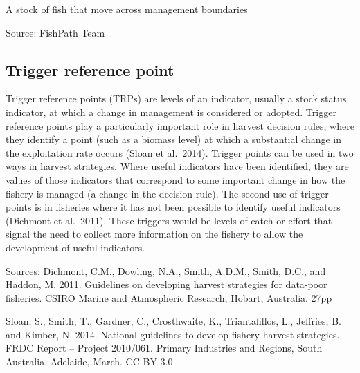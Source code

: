 \documentclass[
  11pt,
]{book}
\begin{document}
A stock of fish that move across management boundaries

Source: FishPath Team

\hypertarget{trigger-reference-point}{%
\subsection{Trigger reference point}\label{trigger-reference-point}}

Trigger reference points (TRPs) are levels of an indicator, usually a stock status indicator, at which a change in management is considered or adopted. Trigger reference points play a particularly important role in harvest decision rules, where they identify a point (such as a biomass level) at which a substantial change in the exploitation rate occurs (Sloan et al.~2014). Trigger points can be used in two ways in harvest strategies. Where useful indicators have been identified, they are values of those indicators that correspond to some important change in how the fishery is managed (a change in the decision rule). The second use of trigger points is in fisheries where it has not been possible to identify useful indicators (Dichmont et al.~2011). These triggers would be levels of catch or effort that signal the need to collect more information on the fishery to allow the development of useful indicators.

Sources: Dichmont, C.M., Dowling, N.A., Smith, A.D.M., Smith, D.C., and Haddon, M. 2011. Guidelines on developing harvest strategies for data-poor fisheries. CSIRO Marine and Atmospheric Research, Hobart, Australia. 27pp

Sloan, S., Smith, T., Gardner, C., Crosthwaite, K., Triantafillos, L., Jeffries, B. and Kimber, N. 2014. National guidelines to develop fishery harvest strategies. FRDC Report -- Project 2010/061. Primary Industries and Regions, South Australia, Adelaide, March. CC BY 3.0

  
\end{document}
